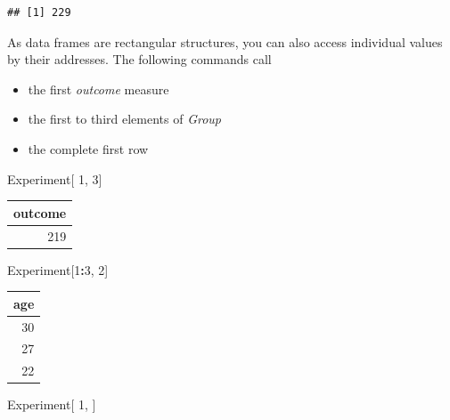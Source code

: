 \documentclass[]{svmono}
\newenvironment{Shaded}{\begin{snugshade}}{\end{snugshade}}
\newcommand{\KeywordTok}[1]{\textcolor[rgb]{0.13,0.29,0.53}{\textbf{#1}}}
\newcommand{\DecValTok}[1]{\textcolor[rgb]{0.00,0.00,0.81}{#1}}
\newcommand{\OperatorTok}[1]{\textcolor[rgb]{0.81,0.36,0.00}{\textbf{#1}}}
\newcommand{\NormalTok}[1]{#1}
\providecommand{\tightlist}{%
  \setlength{\itemsep}{0pt}\setlength{\parskip}{0pt}}
\begin{document}
\begin{Shaded}
\end{Shaded}

\begin{verbatim}
## [1] 229
\end{verbatim}

As data frames are rectangular structures, you can also access
individual values by their addresses. The following commands call

\begin{itemize}
\tightlist
\item
  the first \emph{outcome} measure
\item
  the first to third elements of \emph{Group}
\item
  the complete first row
\end{itemize}

\begin{Shaded}
\begin{Highlighting}[]
\NormalTok{Experiment[  }\DecValTok{1}\NormalTok{, }\DecValTok{3}\NormalTok{]}
\end{Highlighting}
\end{Shaded}

\begin{tabular}{r}
\hline
outcome\\
\hline
219\\
\hline
\end{tabular}

\begin{Shaded}
\begin{Highlighting}[]
\NormalTok{Experiment[}\DecValTok{1}\OperatorTok{:}\DecValTok{3}\NormalTok{, }\DecValTok{2}\NormalTok{]}
\end{Highlighting}
\end{Shaded}

\begin{tabular}{r}
\hline
age\\
\hline
30\\
\hline
27\\
\hline
22\\
\hline
\end{tabular}

\begin{Shaded}
\begin{Highlighting}[]
\NormalTok{Experiment[  }\DecValTok{1}\NormalTok{,  ]}
\end{Highlighting}
\end{Shaded}
\end{document}
